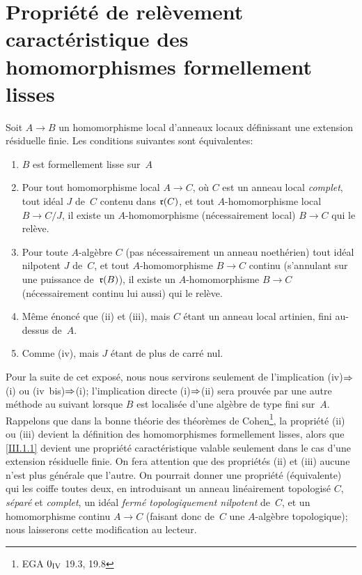 \section[Propri\'et\'e de rel\`evement]{Propri\'et\'e de rel\`evement caract\'eristique des
ho\-mo\-mor\-phis\-mes formellement lisses}
\label{III.2}

\begin{theoreme}
\label{III.2.1}
Soit $A \to B$ un homomorphisme local d'anneaux locaux d\'efinissant
une extension r\'esiduelle finie. Les conditions suivantes sont
\'equivalentes:
\begin{enumerate}
\item[(i)]
$B$ est formellement lisse sur~$A$
\item[(ii)] Pour tout homomorphisme local $A \to C$, o\`u $C$ est un
anneau local \emph{complet}, tout id\'eal $J$ de~$C$ contenu dans
$\mathfrak{r}(C)$,
et tout $A$-homomorphisme local $B \to C/J$, il existe un
$A$-homomorphisme (n\'ecessairement local) $B \to C$ qui le
rel\`eve.
\item[(iii)] Pour toute $A$-alg\`ebre $C$ (pas n\'ecessairement un
anneau noeth\'erien) tout id\'eal nilpotent $J$ de~$C$, et tout
$A$-homomorphisme $B \to C$ continu (\ie s'annulant sur une puissance
de~$\mathfrak{r}(B)$), il existe un $A$-homomorphisme $B \to C$
(n\'ecessairement continu lui aussi) qui le rel\`eve.
\item[(iv)] M\^eme \'enonc\'e que \textup{(ii)} et \textup{(iii)}, mais $C$
\'etant un anneau local artinien, fini au-dessus de~$A$.
\item[(iv~bis)] Comme \textup{(iv)}, mais $J$ \'etant de plus de carr\'e
nul.
\end{enumerate}
\end{theoreme}

\begin{remarquestar}
Pour la suite de cet expos\'e, nous nous servirons seulement de
l'implication (iv)$\To$(i) ou (iv~bis)$\To$(i);
l'implication directe (i)$\To$(ii) sera prouv\'ee par une
autre m\'ethode au \no suivant lorsque $B$ est localis\'ee d'une
alg\`ebre de type fini sur~$A$. Rappelons que dans la \og bonne\fg
th\'eorie des th\'eor\`emes de Cohen\footnote{\Cf EGA
$0_{\textup{IV}}$ 19.3, 19.8}, la propri\'et\'e (ii) ou (iii)
devient la d\'efinition des homomorphismes formellement lisses,
alors que \ref{III.1.1} devient une propri\'et\'e caract\'eristique
valable seulement dans le cas d'une extension r\'esiduelle finie. On
fera attention que des propri\'et\'es (ii) et (iii) aucune n'est
plus g\'en\'erale que l'autre. On pourrait donner une
propri\'et\'e (\'equivalente) qui les coiffe toutes deux, en
introduisant un anneau lin\'eairement topologis\'e $C$,
\emph{séparé} et \emph{complet}, un id\'eal \emph{fermé
topologiquement nilpotent} de~$C$, et un homomorphisme continu $A \to
C$ (faisant donc de~$C$ une $A$-alg\`ebre topologique); nous
laisserons cette modification au lecteur.
\end{remarquestar}

